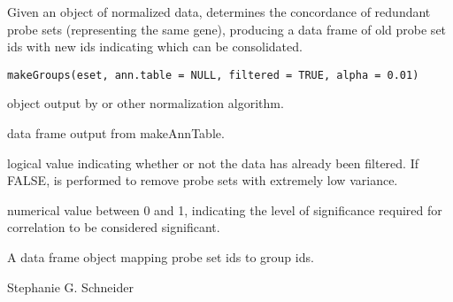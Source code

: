 \documentclass[a4paper]{book}
\begin{document}
%
\begin{Description}\relax
Given an  object of normalized data, determines the concordance of redundant probe sets (representing the same gene), producing a data frame of old probe set ids with new ids indicating which can be consolidated.
\end{Description}
%
\begin{Usage}
\begin{verbatim}
makeGroups(eset, ann.table = NULL, filtered = TRUE, alpha = 0.01)
\end{verbatim}
\end{Usage}
%
\begin{Arguments}
\begin{ldescription}
\item[\code{eset}] 
 object output by  or other normalization algorithm.

\item[\code{ann.table}] 
data frame output from makeAnnTable.

\item[\code{filtered}] 
logical value indicating whether or not the data has already been filtered. If FALSE,  is performed to remove probe sets with extremely low variance.

\item[\code{alpha}] 
numerical value between 0 and 1, indicating the level of significance required for correlation to be considered significant.

\end{ldescription}
\end{Arguments}
%
\begin{Value}
A data frame object mapping probe set ids to group ids.
\end{Value}
%
\begin{Author}\relax
Stephanie G. Schneider
\end{Author}
%
\begin{SeeAlso}\relax
{}
\end{SeeAlso}
%
\end{document}
